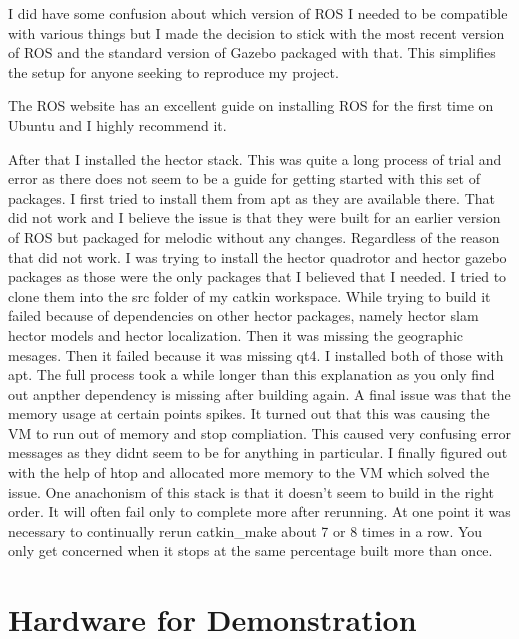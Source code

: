 \documentclass[]{../resources/final_report}
\begin{document}
I did have some confusion about which version of ROS I needed to be compatible with various things 
but I made the decision to stick with the most recent version of ROS and the standard version of 
Gazebo packaged with that. This simplifies the setup for anyone seeking to reproduce my project.

The ROS website\cite{melodic/installation/ubuntu} has an excellent guide on installing ROS for the 
first time on Ubuntu and I highly recommend it.



After that I installed the hector stack. This was quite a long process of trial and error as there 
does not seem to be a guide for getting started with this set of packages. I first tried to install 
them from apt as they are available there. That did not work and I believe the issue is that they 
were built for an earlier version of ROS but packaged for melodic without any changes. Regardless 
of the reason that did not work. I was trying to install the hector quadrotor and hector gazebo 
packages as those were the only packages that I believed that I needed. I tried to clone them into 
the src folder of my catkin workspace. While trying to build it failed because of dependencies on 
other hector packages, namely hector slam hector models and hector localization. Then it was missing 
the geographic mesages. Then it failed because it was missing qt4. I installed both of those with 
apt. The full process took a while longer than this explanation as you only find out anpther 
dependency is missing after building again. A final issue was that the memory usage at certain 
points spikes. It turned out that this was causing the VM to run out of memory and stop compliation. 
This caused very confusing error messages as they didnt seem to be for anything in particular. I 
finally figured out with the help of htop and allocated more memory to the VM which solved the issue. 
One anachonism of this stack is that it doesn't seem to build in the right order. It will often fail 
only to complete more after rerunning. At one point it was necessary to continually rerun catkin\_make 
about 7 or 8 times in a row. You only get concerned when it stops at the same percentage built more 
than once. 


\section{Hardware for Demonstration}
\end{document}
